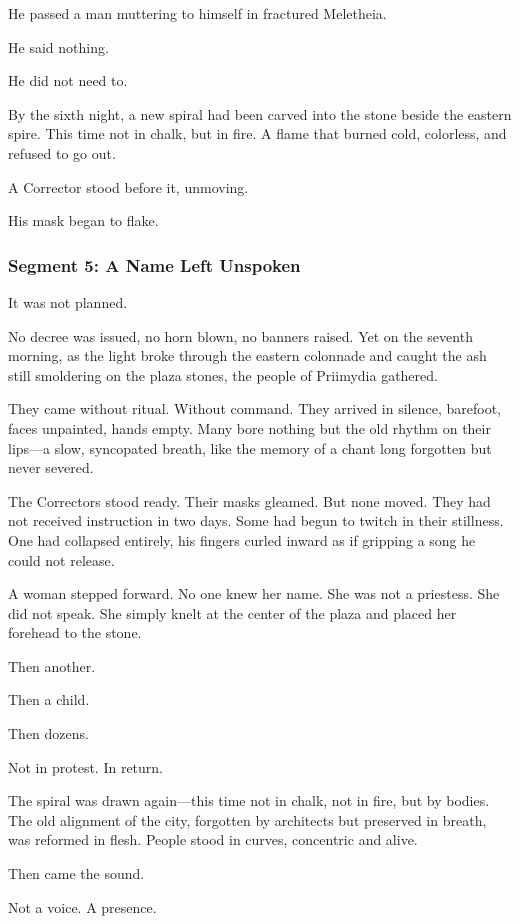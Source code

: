 \documentclass[9pt]{article}
\begin{document}
He passed a man muttering to himself in fractured Meletheia. 

He said nothing. 

He did not need to.

By the sixth night, a new spiral had been carved into the stone beside the eastern spire. This time not in chalk, but in fire. A flame that burned cold, colorless, and refused to go out.

A Corrector stood before it, unmoving.

His mask began to flake.

\newpage

\subsubsection*{Segment 5: A Name Left Unspoken}

It was not planned.

No decree was issued, no horn blown, no banners raised. Yet on the seventh morning, as the light broke through the eastern colonnade and caught the ash still smoldering on the plaza stones, the people of Priimydia gathered.

They came without ritual. Without command. They arrived in silence, barefoot, faces unpainted, hands empty. Many bore nothing but the old rhythm on their lips—a slow, syncopated breath, like the memory of a chant long forgotten but never severed.

The Correctors stood ready. Their masks gleamed. But none moved. They had not received instruction in two days. Some had begun to twitch in their stillness. One had collapsed entirely, his fingers curled inward as if gripping a song he could not release.

A woman stepped forward. No one knew her name. She was not a priestess. She did not speak. She simply knelt at the center of the plaza and placed her forehead to the stone.

Then another.

Then a child.

Then dozens.

Not in protest. In return.

The spiral was drawn again—this time not in chalk, not in fire, but by bodies. The old alignment of the city, forgotten by architects but preserved in breath, was reformed in flesh. People stood in curves, concentric and alive.

Then came the sound.

Not a voice. A presence.
\end{document}

